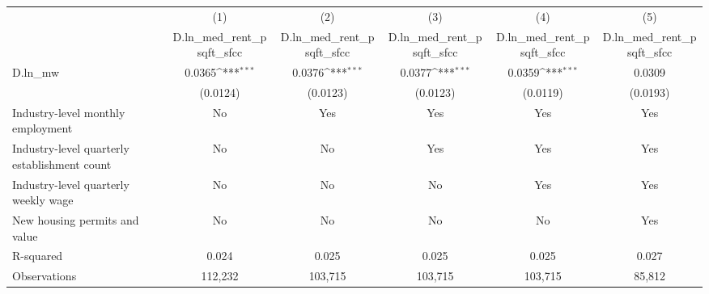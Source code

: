 {
\def\sym#1{\ifmmode^{#1}\else\(^{#1}\)\fi}
\begin{tabular}{l*{5}{c}}
\hline\hline
          &\multicolumn{1}{c}{(1)}&\multicolumn{1}{c}{(2)}&\multicolumn{1}{c}{(3)}&\multicolumn{1}{c}{(4)}&\multicolumn{1}{c}{(5)}\\
          &\multicolumn{1}{c}{D.ln\_med\_rent\_psqft\_sfcc}&\multicolumn{1}{c}{D.ln\_med\_rent\_psqft\_sfcc}&\multicolumn{1}{c}{D.ln\_med\_rent\_psqft\_sfcc}&\multicolumn{1}{c}{D.ln\_med\_rent\_psqft\_sfcc}&\multicolumn{1}{c}{D.ln\_med\_rent\_psqft\_sfcc}\\
\hline
D.ln\_mw   &   0.0365\sym{***}&   0.0376\sym{***}&   0.0377\sym{***}&   0.0359\sym{***}&   0.0309         \\
          & (0.0124)         & (0.0123)         & (0.0123)         & (0.0119)         & (0.0193)         \\
\hline
Industry-level monthly employment&       No         &      Yes         &      Yes         &      Yes         &      Yes         \\
Industry-level quarterly establishment count&       No         &       No         &      Yes         &      Yes         &      Yes         \\
Industry-level quarterly weekly wage&       No         &       No         &       No         &      Yes         &      Yes         \\
New housing permits and value&       No         &       No         &       No         &       No         &      Yes         \\
R-squared &    0.024         &    0.025         &    0.025         &    0.025         &    0.027         \\
Observations&  112,232         &  103,715         &  103,715         &  103,715         &   85,812         \\
\hline\hline
\end{tabular}
}

